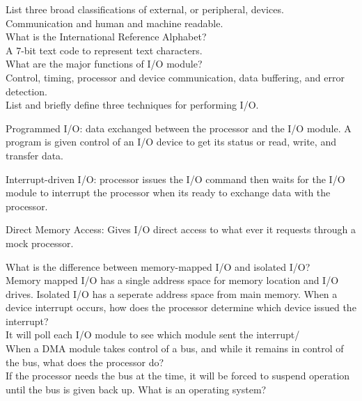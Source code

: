 \documentclass[12pt,largemargins]{homework}
\date{Septemeber 6, 2018}
\begin{document}
\maketitle
{}
List three broad classifications of external, or peripheral, devices.\\
Communication and human and machine readable.\\
What is the International Reference Alphabet?\\
A 7-bit text code to represent text characters.\\
What are the major functions of I/O module?\\
Control, timing, processor and device communication, data buffering, and error detection.\\
List and briefly define three techniques for performing I/O.\\
\begin{alphaparts}
	\item Programmed I/O: data exchanged between the processor and the I/O module.
	A program is given control of an I/O device to get its status or read, write, and transfer data.\\
	\item Interrupt-driven I/O: processor issues the I/O command then waits for the I/O module to interrupt the processor when its ready to exchange data with the processor.\\
	\item Direct Memory Access: Gives I/O direct access to what ever it requests through a mock processor.\\
\end{alphaparts}
What is the difference between memory-mapped I/O and isolated I/O?\\
Memory mapped I/O has a single address space for memory location and I/O drives. Isolated I/O has a seperate address space from main memory.
When a device interrupt occurs, how does the processor determine which device issued the interrupt?\\
It will poll each I/O module to see which module sent the interrupt/\\
When a DMA module takes control of a bus, and while it remains in control of the bus, what does the processor do?\\
If the processor needs the bus at the time, it will be forced to suspend operation until the bus is given back up.
What is an operating system?\\
\end{document}
